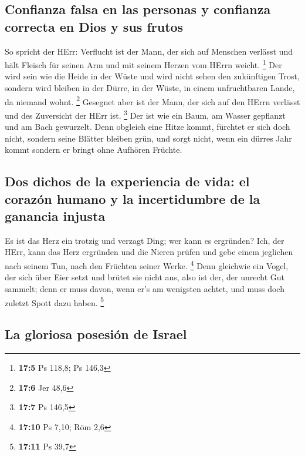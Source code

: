 \hypertarget{confianza-falsa-en-las-personas-y-confianza-correcta-en-dios-y-sus-frutos}{%
\subsection{Confianza falsa en las personas y confianza correcta en Dios
y sus
frutos}\label{confianza-falsa-en-las-personas-y-confianza-correcta-en-dios-y-sus-frutos}}

 So spricht der HErr: Verflucht ist der Mann, der sich auf
Menschen verlässt und hält Fleisch für seinen Arm und mit seinem Herzen
vom HErrn weicht. \footnote{\textbf{17:5} Ps 118,8; Ps 146,3}
 Der wird sein wie die Heide in der Wüste und wird nicht
sehen den zukünftigen Trost, sondern wird bleiben in der Dürre, in der
Wüste, in einem unfruchtbaren Lande, da niemand wohnt. \footnote{\textbf{17:6}
  Jer 48,6}  Gesegnet aber ist der Mann, der sich auf den
HErrn verlässt und des Zuversicht der HErr ist. \footnote{\textbf{17:7}
  Ps 146,5}  Der ist wie ein Baum, am Wasser gepflanzt und
am Bach gewurzelt. Denn obgleich eine Hitze kommt, fürchtet er sich doch
nicht, sondern seine Blätter bleiben grün, und sorgt nicht, wenn ein
dürres Jahr kommt sondern er bringt ohne Aufhören Früchte.

\hypertarget{dos-dichos-de-la-experiencia-de-vida-el-corazuxf3n-humano-y-la-incertidumbre-de-la-ganancia-injusta}{%
\subsection{Dos dichos de la experiencia de vida: el corazón humano y la
incertidumbre de la ganancia
injusta}\label{dos-dichos-de-la-experiencia-de-vida-el-corazuxf3n-humano-y-la-incertidumbre-de-la-ganancia-injusta}}

 Es ist das Herz ein trotzig und verzagt Ding; wer kann es
ergründen?  Ich, der HErr, kann das Herz ergründen und
die Nieren prüfen und gebe einem jeglichen nach seinem Tun, nach den
Früchten seiner Werke. \footnote{\textbf{17:10} Ps 7,10; Röm 2,6}
 Denn gleichwie ein Vogel, der sich über Eier setzt und
brütet sie nicht aus, also ist der, der unrecht Gut sammelt; denn er
muss davon, wenn er's am wenigsten achtet, und muss doch zuletzt Spott
dazu haben. \footnote{\textbf{17:11} Ps 39,7}

\hypertarget{la-gloriosa-posesiuxf3n-de-israel}{%
\subsection{La gloriosa posesión de
Israel}\label{la-gloriosa-posesiuxf3n-de-israel}}

